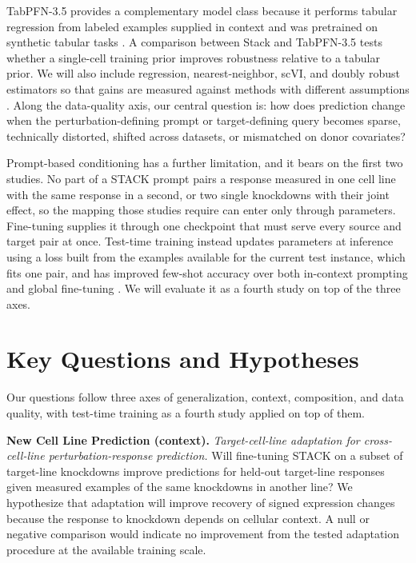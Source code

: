\documentclass[times, twoside, watermark]{zHenriquesLab-StyleBioRxiv}
\begin{document}
TabPFN-3.5 provides a complementary model class because it performs tabular regression from labeled examples supplied in context and was pretrained on synthetic tabular tasks \cite{grinsztajn2026tabpfn3}. A comparison between Stack and TabPFN-3.5 tests whether a single-cell training prior improves robustness relative to a tabular prior. We will also include regression, nearest-neighbor, scVI, and doubly robust estimators so that gains are measured against methods with different assumptions \cite{lopez2018scvi,bang2005doubly}. Along the data-quality axis, our central question is: how does prediction change when the perturbation-defining prompt or target-defining query becomes sparse, technically distorted, shifted across datasets, or mismatched on donor covariates?

Prompt-based conditioning has a further limitation, and it bears on the first two studies. No part of a STACK prompt pairs a response measured in one cell line with the same response in a second, or two single knockdowns with their joint effect, so the mapping those studies require can enter only through parameters. Fine-tuning supplies it through one checkpoint that must serve every source and target pair at once. Test-time training instead updates parameters at inference using a loss built from the examples available for the current test instance, which fits one pair, and has improved few-shot accuracy over both in-context prompting and global fine-tuning \cite{akyurek2025ttt}. We will evaluate it as a fourth study on top of the three axes.

\section*{Key Questions and Hypotheses}

Our questions follow three axes of generalization, context, composition, and data quality, with test-time training as a fourth study applied on top of them.

\noindent\textbf{New Cell Line Prediction (context).}
\emph{Target-cell-line adaptation for cross-cell-line perturbation-response prediction.} Will fine-tuning STACK on a subset of target-line knockdowns improve predictions for held-out target-line responses given measured examples of the same knockdowns in another line? We hypothesize that adaptation will improve recovery of signed expression changes because the response to knockdown depends on cellular context. A null or negative comparison would indicate no improvement from the tested adaptation procedure at the available training scale.
\end{document}
